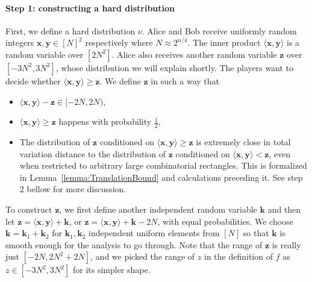 \documentclass[11pt]{article}
\numberwithin{equation}{section}
\theoremstyle{definition}
\theoremstyle{plain}
\theoremstyle{definition}\newtheorem{problem}[theorem]{Problem}\theoremstyle{plain}
\newcommand{\x}{\mathbf{x}}
\newcommand{\y}{\mathbf{y}}
\newcommand{\z}{\mathbf{z}}
\newcommand{\Bk}{\mathbf{k}}   %
\begin{document}
\paragraph{Step 1: constructing a hard distribution}
First, we define a hard distribution $\nu$. Alice and Bob receive uniformly random integers $\x,\y\in [N]^2$ respectively where $N \approx 2^{n/4}$. The inner product $\langle \x,\y\rangle$ is a random variable over $[2N^2]$. Alice also receives another random variable $\z$ over $[-3N^2,3N^2]$, whose distribution we will explain shortly. The players want to decide whether $\langle \x,\y\rangle \ge \z$. We define $\z$ in such a way that
\begin{itemize}
	\item  $\langle \x,\y\rangle -\z  \in [-2N,2N)$,

	\item $\langle \x,\y\rangle \ge \z$  happens with probability $\frac{1}{2}$,
	\item The distribution of $ \z $ conditioned on $\langle \x,\y\rangle \ge \z$ is extremely close in total variation distance to the distribution of $\z$ conditioned on $\langle \x,\y\rangle < \z$, even when restricted to arbitrary large combinatorial rectangles. This is formalized in Lemma~\ref{lemma:TranslationBound} and calculations preceding it. See step 2 bellow for more discussion. 
\end{itemize}
To construct $\z$, we first define another independent random variable $\Bk$ and then let $\z = \langle \x,\y\rangle + \Bk$, or $\z =\langle \x,\y\rangle + \Bk-2N$, with equal probabilities. We choose $\Bk = \Bk_1+\Bk_2 $ for $\Bk_1,\Bk_2$ independent uniform elements from $[N]$ so that $\Bk$ is smooth enough
for the analysis to go through.
Note that the range of $\z$ is really just $[-2N,2N^2+2N]$, and we picked the range of $z$ in the definition of $f$ as $z\in [-3N^2,3N^2]$ for its simpler shape.
\end{document}
